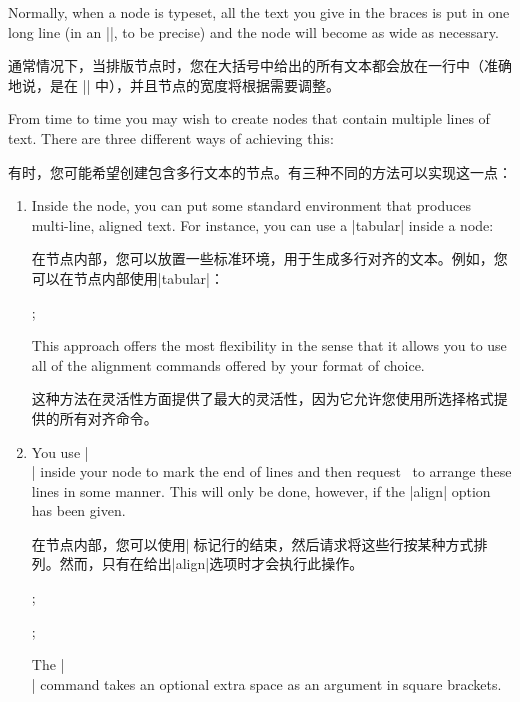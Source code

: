 Normally, when a node is typeset, all the text you give in the braces is put in
one long line (in an |\hbox|, to be precise) and the node will become as wide
as necessary.

通常情况下，当排版节点时，您在大括号中给出的所有文本都会放在一行中（准确地说，是在 |\hbox| 中），并且节点的宽度将根据需要调整。

From time to time you may wish to create nodes that contain multiple lines of
text. There are three different ways of achieving this:

有时，您可能希望创建包含多行文本的节点。有三种不同的方法可以实现这一点：

%
\begin{enumerate}
    \item Inside the node, you can put some standard environment that produces
        multi-line, aligned text. For instance, you can use a |{tabular}|
        inside a node:

        在节点内部，您可以放置一些标准环境，用于生成多行对齐的文本。例如，您可以在节点内部使用|{tabular}|：

\begin{codeexample}[width=5cm]
\tikz {};
\end{codeexample}
        This approach offers the most flexibility in the sense that it allows
        you to use all of the alignment commands offered by your format of
        choice.

        这种方法在灵活性方面提供了最大的灵活性，因为它允许您使用所选择格式提供的所有对齐命令。


    \item You use |\\| inside your node to mark the end of lines and then
        request \tikzname\ to arrange these lines in some manner. This will
        only be done, however, if the |align| option has been given.

        在节点内部，您可以使用|\|来标记行的结束，然后请求\tikzname 将这些行按某种方式排列。然而，只有在给出|align|选项时才会执行此操作。
\begin{codeexample}[]
\tikz[align=left] ;
\end{codeexample}
\begin{codeexample}[]
\tikz[align=center] ;
\end{codeexample}
        The |\\| command takes an optional extra space as an argument in square
        brackets.
        

\end{enumerate}
